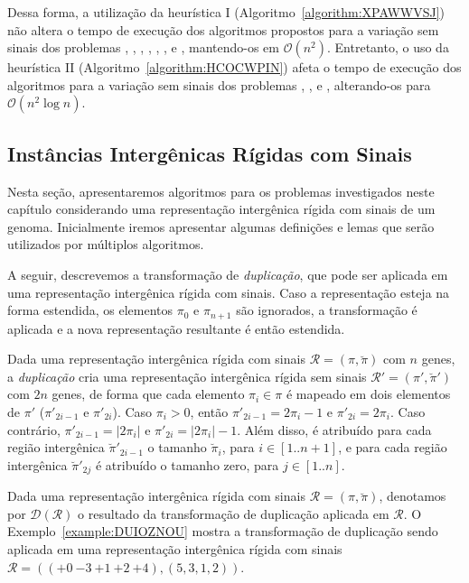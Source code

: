 Dessa forma, a utilização da heurística I (Algoritmo~\ref{algorithm:XPAWWVSJ}) não altera o tempo de execução dos algoritmos propostos para a variação sem sinais dos problemas \SbIR{}, \SbIRI{}, \SbIRM{}, \SbIRMI{}, \SbIRT{}, \SbIRTI{}, \SbIRTM{} e \SbIRTMI{}, mantendo-os em $\mathcal{O}(n^2)$. Entretanto, o uso da heurística II (Algoritmo~\ref{algorithm:HCOCWPIN}) afeta o tempo de execução dos algoritmos para a variação sem sinais dos problemas \SbIRM{}, \SbIRMI{}, \SbIRTM{} e \SbIRTMI{}, alterando-os para $\mathcal{O}(n^2 \log n)$.


\subsection{Instâncias Intergênicas Rígidas com Sinais}

Nesta seção, apresentaremos algoritmos para os problemas investigados neste capítulo considerando uma representação intergênica rígida com sinais de um genoma. Inicialmente iremos apresentar algumas definições e lemas que serão utilizados por múltiplos algoritmos.

A seguir, descrevemos a transformação de \emph{duplicação}, que pode ser aplicada em uma representação intergênica rígida com sinais. Caso a representação esteja na forma estendida, os elementos $\pi_0$ e $\pi_{n+1}$ são ignorados, a transformação é aplicada e a nova representação resultante é então estendida.

\begin{definition}
Dada uma representação intergênica rígida com sinais $\mathcal{R}=(\pi,\breve\pi)$ com $n$ genes, a \emph{duplicação} cria uma representação intergênica rígida sem sinais $\mathcal{R'}=(\pi',\breve\pi')$ com $2n$ genes, de forma que cada elemento $\pi_i \in \pi$ é mapeado em dois elementos de $\pi'$ ($\pi'_{2i-1}$ e $\pi'_{2i}$). Caso $\pi_i > 0$, então $\pi'_{2i-1} = 2\pi_i-1$ e $\pi'_{2i} = 2\pi_i$. Caso contrário, $\pi'_{2i-1} = |2\pi_i|$ e $\pi'_{2i} = |2\pi_i|-1$. Além disso, é atribuído para cada região intergênica $\breve\pi'_{2i-1}$ o tamanho $\breve\pi_i$, para $i\in[1..{n+1}]$, e para cada região intergênica $\breve\pi'_{2j}$ é atribuído o tamanho zero, para $j\in[1..n]$.
\end{definition}

Dada uma representação intergênica rígida com sinais $\mathcal{R}=(\pi,\breve\pi)$, denotamos por $\mathcal{D}(\mathcal{R})$ o resultado da transformação de duplicação aplicada em $\mathcal{R}$. O Exemplo~\ref{example:DUIOZNOU} mostra a transformação de duplicação sendo aplicada em uma representação intergênica rígida com sinais $\mathcal{R}=(({+0}~{-3}~{+1}~{+2}~{+4}),(5,3,1,2))$.

